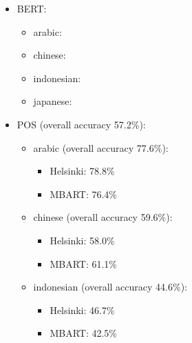 \documentclass[twocolumn]{article}
\begin{document}
\begin{itemize}
	\item BERT:
		\begin{itemize}
		\item{arabic}:
		\item{chinese}:
		\item{indonesian}:
		\item{japanese}:
		\end{itemize}
	\item POS (overall accuracy 57.2\%):
		\begin{itemize}
		\item{arabic} (overall accuracy 77.6\%):
		\begin{itemize}
			\item Helsinki: 78.8\%
			\item MBART: 76.4\%
		\end{itemize}
  
		\item{chinese} (overall accuracy 59.6\%):
		\begin{itemize}
			\item Helsinki: 58.0\%
			\item MBART: 61.1\%
		\end{itemize}
  
		\item{indonesian} (overall accuracy 44.6\%):
		\begin{itemize}
			\item Helsinki: 46.7\%
			\item MBART: 42.5\%
		\end{itemize}
  

\end{itemize}
\end{itemize}
\end{document}
